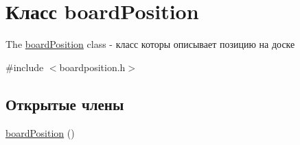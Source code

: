 \hypertarget{classboard_position}{}\section{Класс board\+Position}
\label{classboard_position}


The \hyperlink{classboard_position}{board\+Position} class -\/ класс которы описывает позицию на доске  




{\ttfamily \#include $<$boardposition.\+h$>$}

\subsection*{Открытые члены}
\begin{DoxyCompactItemize}
\item 
\hypertarget{classboard_position_aa90987bb8610bc941f7211d503d95e1d}{}\hyperlink{classboard_position_aa90987bb8610bc941f7211d503d95e1d}{board\+Position} ()\label{classboard_position_aa90987bb8610bc941f7211d503d95e1d}


\end{DoxyCompactItemize}

